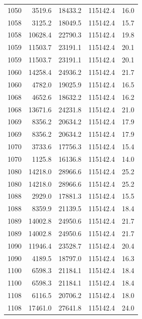 \begin{longtable}{rrrrr}
    1050 & \num{3519.6} & \num{18433.2} & \num{115142.4} & 16.0 \\
    1058 & \num{3125.2} & \num{18049.5} & \num{115142.4} & 15.7 \\
    1058 & \num{10628.4} & \num{22790.3} & \num{115142.4} & 19.8 \\
    1059 & \num{11503.7} & \num{23191.1} & \num{115142.4} & 20.1 \\
    1059 & \num{11503.7} & \num{23191.1} & \num{115142.4} & 20.1 \\
    1060 & \num{14258.4} & \num{24936.2} & \num{115142.4} & 21.7 \\
    1060 & \num{4782.0} & \num{19025.9} & \num{115142.4} & 16.5 \\
    1068 & \num{4652.6} & \num{18632.2} & \num{115142.4} & 16.2 \\
    1068 & \num{13671.6} & \num{24231.8} & \num{115142.4} & 21.0 \\
    1069 & \num{8356.2} & \num{20634.2} & \num{115142.4} & 17.9 \\
    1069 & \num{8356.2} & \num{20634.2} & \num{115142.4} & 17.9 \\
    1070 & \num{3733.6} & \num{17756.3} & \num{115142.4} & 15.4 \\
    1070 & \num{1125.8} & \num{16136.8} & \num{115142.4} & 14.0 \\
    1080 & \num{14218.0} & \num{28966.6} & \num{115142.4} & 25.2 \\
    1080 & \num{14218.0} & \num{28966.6} & \num{115142.4} & 25.2 \\
    1088 & \num{2929.0} & \num{17881.3} & \num{115142.4} & 15.5 \\
    1088 & \num{8359.9} & \num{21139.5} & \num{115142.4} & 18.4 \\
    1089 & \num{14002.8} & \num{24950.6} & \num{115142.4} & 21.7 \\
    1089 & \num{14002.8} & \num{24950.6} & \num{115142.4} & 21.7 \\
    1090 & \num{11946.4} & \num{23528.7} & \num{115142.4} & 20.4 \\
    1090 & \num{4189.5} & \num{18797.0} & \num{115142.4} & 16.3 \\
    1100 & \num{6598.3} & \num{21184.1} & \num{115142.4} & 18.4 \\
    1100 & \num{6598.3} & \num{21184.1} & \num{115142.4} & 18.4 \\
    1108 & \num{6116.5} & \num{20706.2} & \num{115142.4} & 18.0 \\
    1108 & \num{17461.0} & \num{27641.8} & \num{115142.4} & 24.0 \\

\end{longtable}
